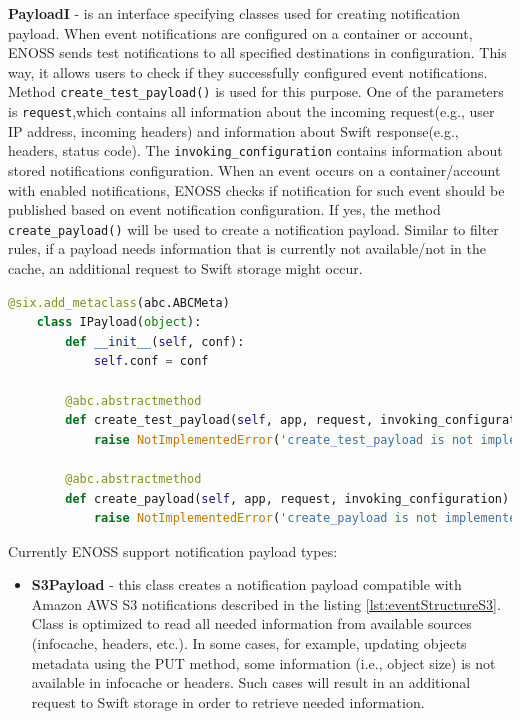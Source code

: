     \textbf{PayloadI} - is an interface specifying classes used for creating notification payload. When event notifications are configured on a container or account, ENOSS sends test notifications to all specified destinations in configuration. This way, it allows users to check if they successfully configured event notifications. Method \texttt{create\_test\_payload()} is used for this purpose. One of the parameters is \texttt{request},which contains all information about the incoming request(e.g., user IP address, incoming headers) and information about Swift response(e.g., headers, status code). The \texttt{invoking\_configuration} contains information about stored notifications configuration. When an event occurs on a container/account with enabled notifications, ENOSS checks if notification for such event should be published based on event notification configuration. If yes, the method \texttt{create\_payload()} will be used to create a notification payload. Similar to filter rules, if a payload needs information that is currently not available/not in the cache, an additional request to Swift storage might occur.

    \begin{lstlisting}[language=Python, style=pythonStyle, caption=Interface of class used to create notification payload, label=lst:enoss-payloadi]
    @six.add_metaclass(abc.ABCMeta)
    class IPayload(object):
        def __init__(self, conf):
            self.conf = conf

        @abc.abstractmethod
        def create_test_payload(self, app, request, invoking_configuration):
            raise NotImplementedError('create_test_payload is not implemented')

        @abc.abstractmethod
        def create_payload(self, app, request, invoking_configuration):
            raise NotImplementedError('create_payload is not implemented')
    \end{lstlisting}

    Currently ENOSS support notification payload types:
    \begin{itemize}
        \item \textbf{S3Payload} - this class creates a notification payload compatible with Amazon AWS S3 notifications described in the listing \ref{lst:eventStructureS3}. Class is optimized to read all needed information from available sources (infocache, headers, etc.). In some cases, for example, updating objects metadata using the PUT method, some information (i.e., object size) is not available in infocache or headers. Such cases will result in an additional request to Swift storage in order to retrieve needed information.
    \end{itemize}

